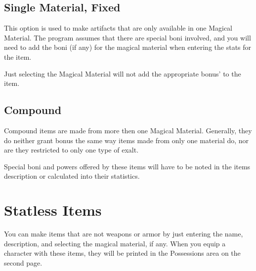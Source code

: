 \subsection{Single Material, Fixed}
This option is used to make artifacts that are only available in one Magical Material.
The program assumes that there are special boni involved, and you will need to add the boni (if any) for the magical material when entering the stats for the item. 

Just selecting the Magical Material will not add the appropriate bonus' to the item.

\subsection{Compound}
Compound items are made from more then one Magical Material. Generally, they do neither grant bonus the same way items made from only one material do, nor are they restricted to only one type of exalt.  

Special boni and powers offered by these items will have to be noted in the items description or calculated into their statistics.

\section{Statless Items}
You can make items that are not weapons or armor by just entering the name, description, and selecting the magical material, if any. When you equip a character with these items, they will be printed in the Possessions area on the second page.